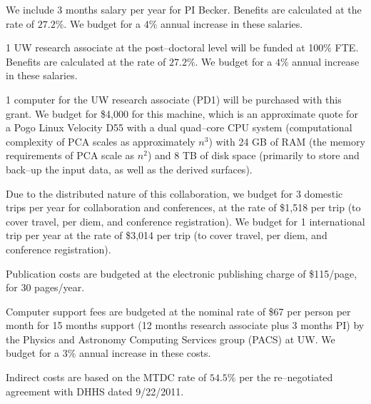 \bigskip {} We include 3 months salary per year for PI
Becker. Benefits are calculated at the rate of $27.2\%$.  We budget for a $4\%$
annual increase in these salaries.

\bigskip {} 1 UW research associate at the
post--doctoral level will be funded at 100\% FTE.  Benefits are calculated at
the rate of $27.2\%$.  We budget for a $4\%$ annual increase in these salaries.

\bigskip {} 1 computer for the UW research associate
(PD1) will be purchased with this grant. We budget for \$4,000 for this machine,
which is an approximate quote for a Pogo Linux Velocity D55 with a dual
quad--core CPU system (computational complexity of PCA scales as approximately
$n^3$) with 24 GB of RAM (the memory requirements of PCA scale as $n^2$) and 8
TB of disk space (primarily to store and back--up the input data, as well as the
derived surfaces).

\bigskip {} Due to the distributed nature of this
collaboration, we budget for 3 domestic trips per year for collaboration and
conferences, at the rate of \$1,518 per trip (to cover travel, per diem, and
conference registration).  We budget for 1 international trip per year at the
rate of \$3,014 per trip (to cover travel, per diem, and conference
registration).

\bigskip {} Publication costs are budgeted at
the electronic publishing charge of \$115/page, for 30 pages/year.

\bigskip {} Computer support fees are budgeted at
the nominal rate of \$67 per person per month for 15 months support (12 months
research associate plus 3 months PI) by the Physics and Astronomy Computing
Services group (PACS) at UW.  We budget for a $3\%$ annual increase in these
costs.

\bigskip {} Indirect costs are based on the MTDC rate of
$54.5\%$ per the re--negotiated agreement with DHHS dated 9/22/2011.
